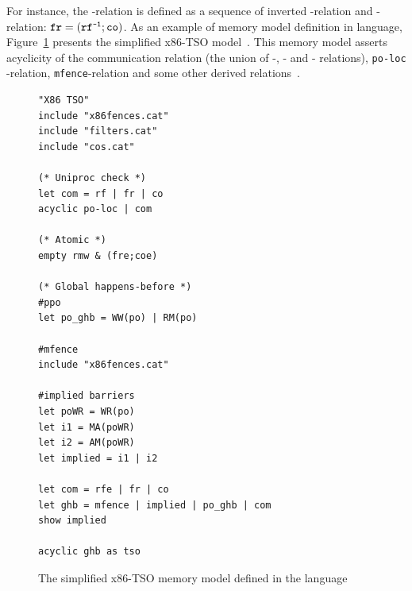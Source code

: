 For instance, the \fr-relation is defined as a sequence of inverted \rf-relation and \co-relation: $\texttt{fr} = (\texttt{rf}^{\texttt{-1}};\texttt{co})$.
As an example of memory model definition in \cat{} language, Figure~\ref{ex:x86-cat} presents the simplified x86-TSO model~\cite{herd10tutorial}.
This memory model asserts  acyclicity of the communication relation (the union of \rf-, \fr- and \co- relations), \texttt{po-loc} -relation, \texttt{mfence}-relation and some other derived relations~\cite{owens2009better}.


\begin{figure}[h]
\begin{lstlisting}
"X86 TSO"
include "x86fences.cat"
include "filters.cat"
include "cos.cat"

(* Uniproc check *)
let com = rf | fr | co
acyclic po-loc | com

(* Atomic *)
empty rmw & (fre;coe)

(* Global happens-before *)
#ppo
let po_ghb = WW(po) | RM(po)

#mfence
include "x86fences.cat"

#implied barriers
let poWR = WR(po)
let i1 = MA(poWR)
let i2 = AM(poWR)
let implied = i1 | i2

let com = rfe | fr | co
let ghb = mfence | implied | po_ghb | com
show implied

acyclic ghb as tso
\end{lstlisting}
\caption{The simplified x86-TSO memory model defined in the \cat{} language~\cite{herd10tutorial}}
\label{ex:x86-cat}
\end{figure}
